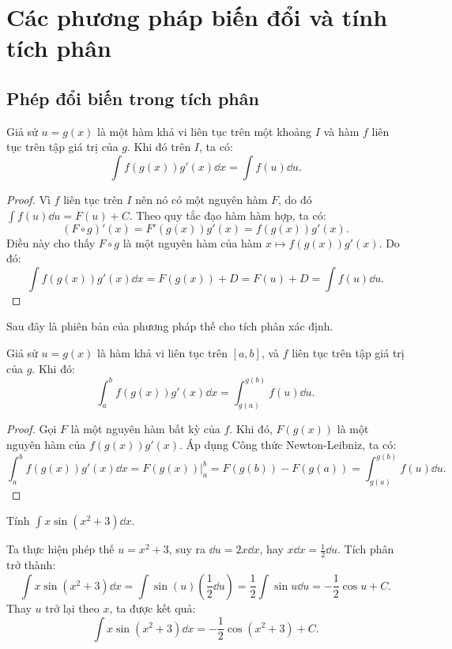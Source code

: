 \section{Các phương pháp biến đổi và tính tích phân}

\subsection{Phép đổi biến trong tích phân}
\begin{theorem}
    Giả sử $u = g(x)$ là một hàm khả vi liên tục trên một khoảng $I$ và hàm $f$ liên tục trên tập giá trị của $g$. Khi đó trên $I$, ta có:
    \[ \int f(g(x))g'(x) \dd x = \int f(u) \dd u. \]
\end{theorem}
\begin{proof}
    Vì $f$ liên tục trên $I$ nên nó có một nguyên hàm $F$, do đó $\int f(u) \dd u = F(u) + C$. Theo quy tắc đạo hàm hàm hợp, ta có:
    \[
        (F \circ g)'(x) = F'(g(x))g'(x) = f(g(x))g'(x).
    \]
    Điều này cho thấy $F \circ g$ là một nguyên hàm của hàm $x \mapsto f(g(x))g'(x)$. Do đó:
    \[
        \int f(g(x))g'(x) \dd x = F(g(x)) + D = F(u) + D = \int f(u) \dd u.
    \]
\end{proof}

Sau đây là phiên bản của phương pháp thế cho tích phân xác định.
\begin{theorem}
    Giả sử $u = g(x)$ là hàm khả vi liên tục trên $[a, b]$, và $f$ liên tục trên tập giá trị của $g$. Khi đó:
    \begin{equation}
        \int_a^b f(g(x))g'(x) \dd x = \int_{g(a)}^{g(b)} f(u) \dd u.
    \end{equation}
\end{theorem}
\begin{proof}
    Gọi $F$ là một nguyên hàm bất kỳ của $f$. Khi đó, $F(g(x))$ là một nguyên hàm của $f(g(x))g'(x)$. Áp dụng Công thức Newton-Leibniz, ta có:
    \[
        \int_a^b f(g(x))g'(x) \dd x = F(g(x))\bigg|_a^b = F(g(b)) - F(g(a)) = \int_{g(a)}^{g(b)} f(u) \dd u.
    \]
\end{proof}

\begin{example}
    Tính $\int x \sin(x^2 + 3) \dd x$.
\end{example}
\begin{solution}
    Ta thực hiện phép thế $u = x^2+3$, suy ra $\dd u = 2x \dd x$, hay $x \dd x = \frac{1}{2}\dd u$. Tích phân trở thành:
    \[
        \int x \sin(x^2 + 3) \dd x = \int \sin(u) \left(\frac{1}{2}\dd u\right) = \frac{1}{2}\int \sin u \dd u = -\frac{1}{2}\cos u + C.
    \]
    Thay $u$ trở lại theo $x$, ta được kết quả:
    \[
        \int x \sin(x^2 + 3) \dd x = -\frac{1}{2}\cos(x^2+3) + C.
    \]
\end{solution}

